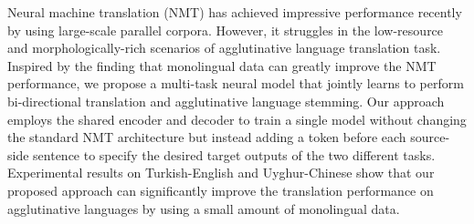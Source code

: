 Neural machine translation (NMT) has achieved impressive performance recently by using large-scale parallel corpora. However, it struggles in the low-resource and morphologically-rich scenarios of agglutinative language translation task. Inspired by the finding that monolingual data can greatly improve the NMT performance, we propose a multi-task neural model that jointly learns to perform bi-directional translation and agglutinative language stemming. Our approach employs the shared encoder and decoder to train a single model without changing the standard NMT architecture but instead adding a token before each source-side sentence to specify the desired target outputs of the two different tasks. Experimental results on Turkish-English and Uyghur-Chinese show that our proposed approach can significantly improve the translation performance on agglutinative languages by using a small amount of monolingual data.

